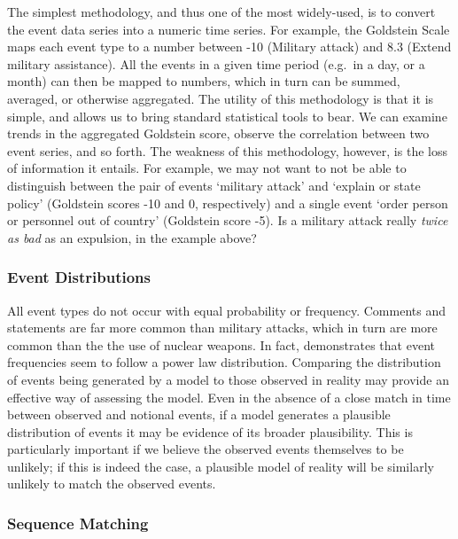 The simplest methodology, and thus one of the most widely-used, is to convert the event data series into a numeric time series. For example, the Goldstein Scale \citep{goldstein_1992} maps each event type to a number between -10 (Military attack) and 8.3 (Extend military assistance). All the events in a given time period (e.g.~in a day, or a month) can then be mapped to numbers, which in turn can be summed, averaged, or otherwise aggregated. The utility of this methodology is that it is simple, and allows us to bring standard statistical tools to bear. We can examine trends in the aggregated Goldstein score, observe the correlation between two event series, and so forth. The weakness of this methodology, however, is the loss of information it entails. For example, we may not want to not be able to distinguish between the pair of events `military attack' and `explain or state policy' (Goldstein scores -10 and 0, respectively) and a single event `order person or personnel out of country' (Goldstein score -5). Is a military attack really \emph{twice as bad} as an expulsion, in the example above?

\subsubsection{Event Distributions}\label{event-distributions}

All event types do not occur with equal probability or frequency. Comments and statements are far more common than military attacks, which in turn are more common than the the use of nuclear weapons. In fact, \citet{schrodt_2008} demonstrates that event frequencies seem to follow a power law distribution. Comparing the distribution of events being generated by a model to those observed in reality may provide an effective way of assessing the model. Even in the absence of a close match in time between observed and notional events, if a model generates a plausible distribution of events it may be evidence of its broader plausibility. This is particularly important if we believe the observed events themselves to be unlikely; if this is indeed the case, a plausible model of reality will be similarly unlikely to match the observed events.

\subsubsection{Sequence Matching}\label{sequence-matching}

